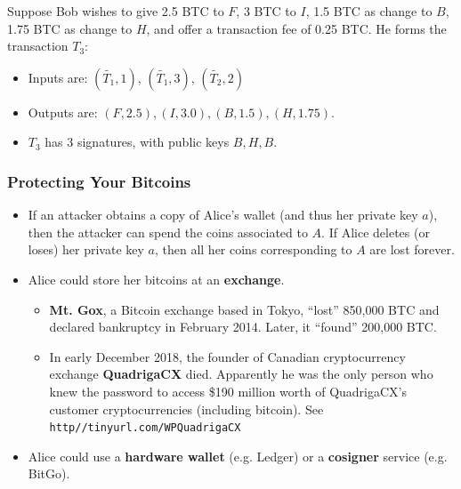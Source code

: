 \documentclass[12pt,titlepage]{article}
\begin{document}
Suppose Bob wishes to give 2.5 BTC to $F$, 3 BTC to $I$, 1.5 BTC as change to $B$, 1.75 BTC as change to $H$, and offer a transaction fee of 0.25 BTC.
He forms the transaction $T_3$:\begin{itemize}
	\item Inputs are: $(\widetilde{T_1}, 1)$, $(\widetilde{T_1} , 3)$, $(\widetilde{T_2}, 2)$
	\item Outputs are: $(F, 2.5), (I, 3.0), (B, 1.5), (H, 1.75)$.
	\item $T_3$ has 3 signatures, with public keys $B, H, B$.
\end{itemize}
\subsubsection{Protecting Your Bitcoins}
\begin{itemize}
	\item If an attacker obtains a copy of Alice’s wallet (and thus her private key $a$), then the attacker can spend the coins associated to $A$. If Alice deletes (or loses) her private key $a$, then all her coins corresponding to $A$ are lost forever.
	\item Alice could store her bitcoins at an \textbf{exchange}.\begin{itemize}
		\item \textbf{Mt. Gox}, a Bitcoin exchange based in Tokyo, 	``lost'' 850,000 BTC and declared bankruptcy in February 2014. Later, it ``found'' 200,000 BTC.
		\item In early December 2018, the founder of Canadian cryptocurrency exchange \textbf{QuadrigaCX} died. Apparently he was the only person who knew the password to access \$190 million worth of QuadrigaCX’s customer cryptocurrencies (including bitcoin). See \texttt{http//tinyurl.com/WPQuadrigaCX}
	\end{itemize}
	\item Alice could use a \textbf{hardware wallet} (e.g. Ledger) or a \textbf{cosigner} service (e.g. BitGo).
\end{itemize}
\end{document}
